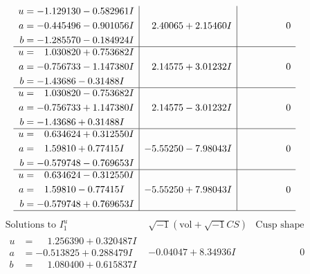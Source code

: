 \documentclass[1p]{elsarticle_modified}
\theoremstyle{definition}
\newcommand{\I}{\sqrt{-1}}
\begin{document}
$$\begin{array}{c|c|c}
\begin{aligned}
u &= -1.129130 - 0.582961 I \\
a &= -0.445496 - 0.901056 I \\
b &= -1.285570 - 0.184924 I\end{aligned}
 & \phantom{-}2.40065 + 2.15460 I & \phantom{-0.000000 } 0 \\ \hline\begin{aligned}
u &= \phantom{-}1.030820 + 0.753682 I \\
a &= -0.756733 - 1.147380 I \\
b &= -1.43686 - 0.31488 I\end{aligned}
 & \phantom{-}2.14575 + 3.01232 I & \phantom{-0.000000 } 0 \\ \hline\begin{aligned}
u &= \phantom{-}1.030820 - 0.753682 I \\
a &= -0.756733 + 1.147380 I \\
b &= -1.43686 + 0.31488 I\end{aligned}
 & \phantom{-}2.14575 - 3.01232 I & \phantom{-0.000000 } 0 \\ \hline\begin{aligned}
u &= \phantom{-}0.634624 + 0.312550 I \\
a &= \phantom{-}1.59810 + 0.77415 I \\
b &= -0.579748 - 0.769653 I\end{aligned}
 & -5.55250 - 7.98043 I & \phantom{-0.000000 } 0 \\ \hline\begin{aligned}
u &= \phantom{-}0.634624 - 0.312550 I \\
a &= \phantom{-}1.59810 - 0.77415 I \\
b &= -0.579748 + 0.769653 I\end{aligned}
 & -5.55250 + 7.98043 I & \phantom{-0.000000 } 0\\
 \hline 
 \end{array}$$\newpage$$\begin{array}{c|c|c}  
\text{Solutions to }I^u_{1}& \I (\text{vol} + \sqrt{-1}CS) & \text{Cusp shape}\\
 \hline 
\begin{aligned}
u &= \phantom{-}1.256390 + 0.320487 I \\
a &= -0.513825 + 0.288479 I \\
b &= \phantom{-}1.080400 + 0.615837 I\end{aligned}
 & -0.04047 + 8.34936 I & \phantom{-0.000000 } 0 \\ \hline\begin{aligned}

\end{aligned}
\end{array}$$
\end{document}
